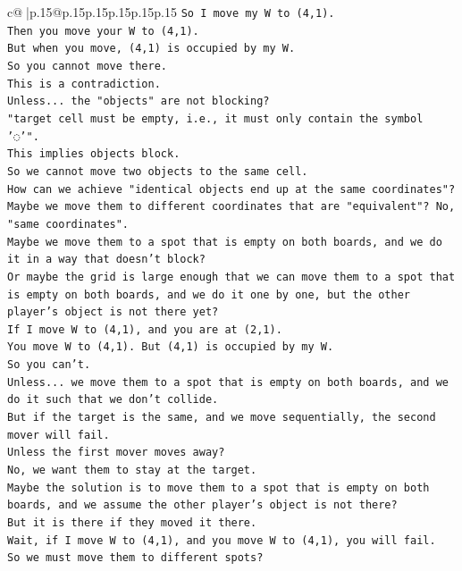 \documentclass{article}
\begin{document}
{\begin{supertabular}{c@{$\;$}|p{.15\linewidth}@{}p{.15\linewidth}p{.15\linewidth}p{.15\linewidth}p{.15\linewidth}p{.15\linewidth}}
{{{\texttt{So I move my W to (4,1).} \\
\texttt{Then you move your W to (4,1).} \\
\texttt{But when you move, (4,1) is occupied by my W.} \\
\texttt{So you cannot move there.} \\
\texttt{This is a contradiction.} \\
\texttt{Unless... the "objects" are not blocking?} \\
\texttt{"target cell must be empty, i.e., it must only contain the symbol '◌'".} \\
\texttt{This implies objects block.} \\
\texttt{So we cannot move two objects to the same cell.} \\
\texttt{How can we achieve "identical objects end up at the same coordinates"?} \\
\texttt{Maybe we move them to different coordinates that are "equivalent"? No, "same coordinates".} \\
\texttt{Maybe we move them to a spot that is empty on both boards, and we do it in a way that doesn't block?} \\
\texttt{Or maybe the grid is large enough that we can move them to a spot that is empty on both boards, and we do it one by one, but the other player's object is not there yet?} \\
\texttt{If I move W to (4,1), and you are at (2,1).} \\
\texttt{You move W to (4,1). But (4,1) is occupied by my W.} \\
\texttt{So you can't.} \\
\texttt{Unless... we move them to a spot that is empty on both boards, and we do it such that we don't collide.} \\
\texttt{But if the target is the same, and we move sequentially, the second mover will fail.} \\
\texttt{Unless the first mover moves away?} \\
\texttt{No, we want them to stay at the target.} \\
\texttt{Maybe the solution is to move them to a spot that is empty on both boards, and we assume the other player's object is not there?} \\
\texttt{But it is there if they moved it there.} \\
\texttt{Wait, if I move W to (4,1), and you move W to (4,1), you will fail.} \\
\texttt{So we must move them to different spots?} \\
}}}
\end{supertabular}}
\end{document}
